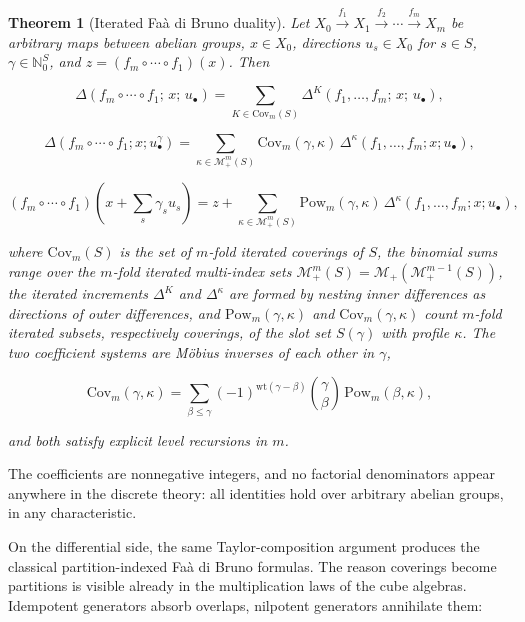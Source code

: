 \documentclass[10pt,a4paper]{article}
\theoremstyle{plain}
\newtheorem{theorem}{Theorem}
\theoremstyle{definition}
\newcommand{\IN}{\mathbb{N}} %
\newcommand{\1}{\mathbb{1}} %
\newcommand{\KM}{\mathcal{M}} %
\newcommand{\Cov}{\mathrm{Cov}} %
\begin{document}
\begin{theorem}[Iterated Faà di Bruno duality]

Let
\(X_0 \xrightarrow{f_1} X_1 \xrightarrow{f_2} \cdots \xrightarrow{f_m} X_m\)
be arbitrary maps between abelian groups, \(x \in X_0\), directions
\(u_s \in X_0\) for \(s \in S\), \(\gamma \in \IN_0^S\), and
\(z = (f_m \circ \cdots \circ f_1)(x)\). Then

\[
  \Delta(f_m \circ \cdots \circ f_1;\, x;\, u_\bullet) = \sum_{K \in \Cov_m(S)} \Delta^{K}(f_1, \dots, f_m;\, x;\, u_\bullet),
\]

\[
  \Delta(f_m \circ \cdots \circ f_1; x; u_\bullet^\gamma) = \sum_{\kappa \in \KM_+^m(S)} \Cov_m(\gamma, \kappa)\, \Delta^{\kappa}(f_1, \dots, f_m; x; u_\bullet),
\]

\[
  (f_m \circ \cdots \circ f_1)(x + {\textstyle\sum_s} \gamma_s u_s) = z + \sum_{\kappa \in \KM_+^m(S)} \mathrm{Pow}_m(\gamma, \kappa)\, \Delta^{\kappa}(f_1, \dots, f_m; x; u_\bullet),
\]

where \(\Cov_m(S)\) is the set of \(m\)-fold iterated coverings of
\(S\), the binomial sums range over the \(m\)-fold iterated multi-index
sets \(\KM_+^m(S) = \KM_+(\KM_+^{m-1}(S))\), the iterated increments
\(\Delta^{K}\) and \(\Delta^{\kappa}\) are formed by nesting inner
differences as directions of outer differences, and
\(\mathrm{Pow}_m(\gamma, \kappa)\) and \(\Cov_m(\gamma, \kappa)\) count
\(m\)-fold iterated subsets, respectively coverings, of the slot set
\(S(\gamma)\) with profile \(\kappa\). The two coefficient systems are
Möbius inverses of each other in \(\gamma\),

\[
  \Cov_m(\gamma, \kappa) = \sum_{\beta \leq \gamma} (-1)^{\mathrm{wt}(\gamma - \beta)} \binom{\gamma}{\beta}\, \mathrm{Pow}_m(\beta, \kappa),
\]

and both satisfy explicit level recursions in \(m\).

\end{theorem}

The coefficients are nonnegative integers, and no factorial denominators
appear anywhere in the discrete theory: all identities hold over
arbitrary abelian groups, in any characteristic.

On the differential side, the same Taylor-composition argument produces
the classical partition-indexed Faà di Bruno formulas. The reason
coverings become partitions is visible already in the multiplication
laws of the cube algebras. Idempotent generators absorb overlaps,
nilpotent generators annihilate them:
\end{document}
